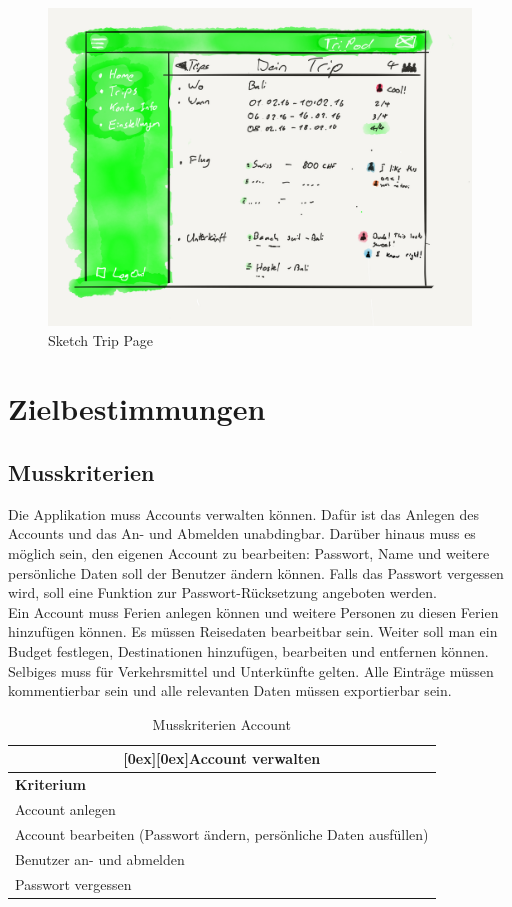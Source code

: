 \documentclass[10pt,a4paper,titlepage,twoside,german,final]{zhawreprt}
\newcommand{\tableheader}[2]{\multicolumn{#1}{c}{\raisebox{-0.3em}[0ex][0ex]{\large{\textbf{#2}}}}}
\numberwithin{table}{chapter}
\begin{document}
\begin{figure}
  \includegraphics[width=\linewidth]{images/wire_Trip.png}
  \caption{Sketch Trip Page}
  \label{fig:TripPodLogo}
\end{figure}


\chapter{Zielbestimmungen}\label{chp:DefinitionOfGoals}
\section{Musskriterien}\label{sec:MustCriteria}
Die Applikation muss Accounts verwalten können. Dafür ist das Anlegen des Accounts und das An- und Abmelden unabdingbar. Darüber hinaus muss es möglich sein, den eigenen Account zu bearbeiten: Passwort, Name und weitere persönliche Daten soll der Benutzer ändern können. Falls das Passwort vergessen wird, soll eine Funktion zur Passwort-Rücksetzung angeboten werden.\\
Ein Account muss Ferien anlegen können und weitere Personen zu diesen Ferien hinzufügen können. Es müssen Reisedaten bearbeitbar sein. Weiter soll man ein Budget festlegen, Destinationen hinzufügen, bearbeiten und entfernen können. Selbiges muss für Verkehrsmittel und Unterkünfte gelten. Alle Einträge müssen kommentierbar sein und alle relevanten Daten müssen exportierbar sein.
\begin{table}[ht]\centering
\begin{tabular}{l}\hline
\tableheader{1}{Account verwalten}\\[0.3em]\hline
\textbf{Kriterium}\\\hline
Account anlegen\\\hline
Account bearbeiten (Passwort ändern, persönliche Daten ausfüllen)\\\hline
Benutzer an- und abmelden\\\hline
Passwort vergessen\\\hline
\end{tabular}
\caption{Musskriterien Account}\label{tbl:MustAccount}
\end{table}
\end{document}
